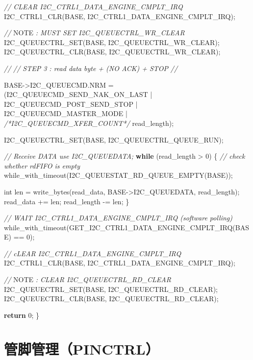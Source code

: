\documentclass[
  12pt,
]{book}
\newenvironment{Shaded}{\begin{snugshade}}{\end{snugshade}}
\newcommand{\AlertTok}[1]{\textcolor[rgb]{0.94,0.16,0.16}{#1}}
\newcommand{\CommentTok}[1]{\textcolor[rgb]{0.56,0.35,0.01}{\textit{#1}}}
\newcommand{\ControlFlowTok}[1]{\textcolor[rgb]{0.13,0.29,0.53}{\textbf{#1}}}
\newcommand{\DataTypeTok}[1]{\textcolor[rgb]{0.13,0.29,0.53}{#1}}
\newcommand{\DecValTok}[1]{\textcolor[rgb]{0.00,0.00,0.81}{#1}}
\newcommand{\NormalTok}[1]{#1}
\begin{document}
\begin{Shaded}
\begin{Highlighting}[]
    \CommentTok{// CLEAR I2C_CTRL1_DATA_ENGINE_CMPLT_IRQ}
\NormalTok{    I2C_CTRL1_CLR(BASE, I2C_CTRL1_DATA_ENGINE_CMPLT_IRQ);}

    \CommentTok{// }\AlertTok{NOTE}\CommentTok{ : MUST SET I2C_QUEUECTRL_WR_CLEAR}
\NormalTok{    I2C_QUEUECTRL_SET(BASE, I2C_QUEUECTRL_WR_CLEAR);}
\NormalTok{    I2C_QUEUECTRL_CLR(BASE, I2C_QUEUECTRL_WR_CLEAR);}


    \CommentTok{//}
    \CommentTok{// STEP 3 : read data byte + (NO ACK) + STOP}
    \CommentTok{//}

\NormalTok{    BASE->I2C_QUEUECMD.NRM = (I2C_QUEUECMD_SEND_NAK_ON_LAST | I2C_QUEUECMD_POST_SEND_STOP | I2C_QUEUECMD_MASTER_MODE |}
         \CommentTok{/*I2C_QUEUECMD_XFER_COUNT*/}
\NormalTok{         read_length);}

\NormalTok{    I2C_QUEUECTRL_SET(BASE, I2C_QUEUECTRL_QUEUE_RUN);}

    \CommentTok{// Receive DATA use I2C_QUEUEDATA;}
    \ControlFlowTok{while}\NormalTok{ (read_length > }\DecValTok{0}\NormalTok{)}
\NormalTok{    \{}
        \CommentTok{// check whether rdFIFO is empty}
\NormalTok{        while_with_timeout(I2C_QUEUESTAT_RD_QUEUE_EMPTY(BASE));}

        \DataTypeTok{int}\NormalTok{ len = write_bytes(read_data, BASE->I2C_QUEUEDATA, read_length);}
\NormalTok{        read_data += len;}
\NormalTok{        read_length -= len;}
\NormalTok{    \}}

    \CommentTok{// WAIT I2C_CTRL1_DATA_ENGINE_CMPLT_IRQ (software polling)}
\NormalTok{    while_with_timeout(GET_I2C_CTRL1_DATA_ENGINE_CMPLT_IRQ(BASE) == }\DecValTok{0}\NormalTok{);}

    \CommentTok{// cLEAR I2C_CTRL1_DATA_ENGINE_CMPLT_IRQ}
\NormalTok{    I2C_CTRL1_CLR(BASE, I2C_CTRL1_DATA_ENGINE_CMPLT_IRQ);}

    \CommentTok{// }\AlertTok{NOTE}\CommentTok{ : CLEAR I2C_QUEUECTRL_RD_CLEAR}
\NormalTok{    I2C_QUEUECTRL_SET(BASE, I2C_QUEUECTRL_RD_CLEAR);}
\NormalTok{    I2C_QUEUECTRL_CLR(BASE, I2C_QUEUECTRL_RD_CLEAR);}


    \ControlFlowTok{return} \DecValTok{0}\NormalTok{;}
\NormalTok{\}}
\end{Highlighting}
\end{Shaded}

\hypertarget{ch-pinctrl}{%
\chapter{管脚管理（PINCTRL）}\label{ch-pinctrl}}
\end{document}
